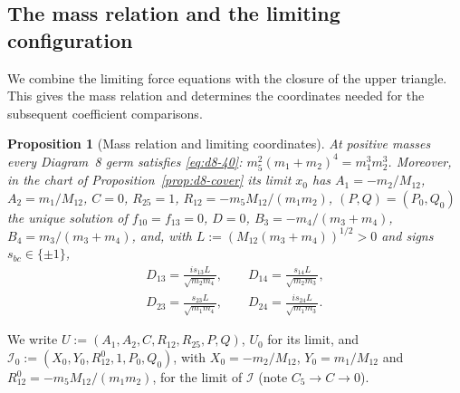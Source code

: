\documentclass[Threeside,11pt]{article}
\newtheorem{proposition}[theorem]{Proposition}
\theoremstyle{definition}
\theoremstyle{remark}
\numberwithin{equation}{section}
\theoremstyle{remark}
\begin{document}
\subsection{The mass relation and the limiting configuration}
We combine the limiting force equations with the closure of the upper
triangle.  This gives the mass relation and determines the coordinates needed
for the subsequent coefficient comparisons.

\begin{proposition}[Mass relation and limiting coordinates]\label{prop:d8-first}
At positive masses every Diagram~8 germ satisfies \eqref{eq:d8-40}:
$m_5^2(m_1+m_2)^4=m_1^3m_2^3$.  Moreover, in the chart of Proposition~\ref{prop:d8-cover} its
limit $x_0$ has $A_1=-m_2/M_{12}$, $A_2=m_1/M_{12}$, $C=0$, $R_{25}=1$,
$R_{12}=-m_5M_{12}/(m_1m_2)$, $(P,Q)=(P_0,Q_0)$ the unique solution of $f_{10}=f_{13}=0$,
$D=0$, $B_3=-m_4/(m_3+m_4)$, $B_4=m_3/(m_3+m_4)$, and, with $L:=(M_{12}(m_3+m_4))^{1/2}>0$ and
signs $s_{bc}\in\{\pm1\}$,
\begin{gather*}
  D_{13}=\frac{is_{13}L}{\sqrt{m_2m_4}},\qquad D_{14}=\frac{s_{14}L}{\sqrt{m_2m_3}},\\
  D_{23}=\frac{s_{23}L}{\sqrt{m_1m_4}},\qquad D_{24}=\frac{is_{24}L}{\sqrt{m_1m_3}}.
\end{gather*}
\end{proposition}
We write $U:=(A_1,A_2,C,R_{12},R_{25},P,Q)$, $U_0$ for its limit, and
$\mathcal I_0:=(X_0,Y_0,R_{12}^0,1,P_0,Q_0)$, with $X_0=-m_2/M_{12}$, $Y_0=m_1/M_{12}$ and
$R_{12}^0=-m_5M_{12}/(m_1m_2)$, for the limit of $\mathcal I$ (note $C_5\to C\to0$).
\end{document}
